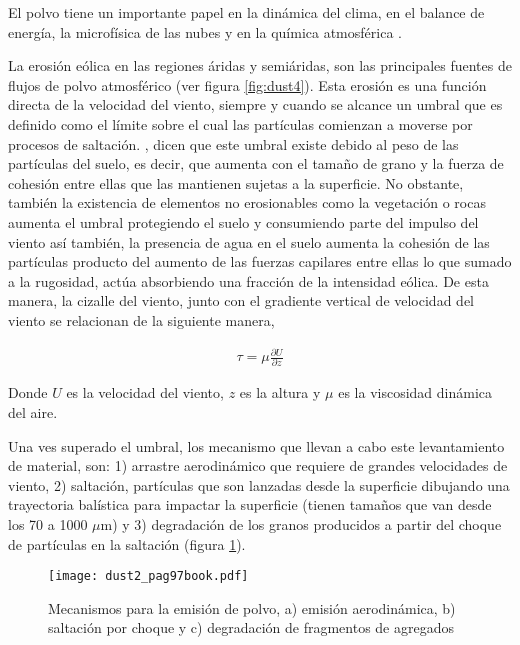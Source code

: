El polvo tiene un importante papel en la dinámica 
del clima, en el balance de energía, la microfísica de las nubes y en la química atmosférica \citep{tegen1994modeling,ridgwell2002dust,mahowald2011aerosol}. 

La erosión eólica en las regiones áridas y semiáridas, son las principales fuentes de flujos de polvo atmosférico (ver figura \ref{fig:dust4}). Esta erosión es una función directa de la velocidad del viento, siempre  y cuando se alcance un umbral que es definido como el límite sobre el cual las partículas comienzan a moverse por procesos de saltación. \cite{iversen1982saltation}, dicen que este umbral existe debido al peso de las partículas del suelo, es decir, que aumenta con el tamaño de grano y la fuerza de cohesión entre ellas que las mantienen sujetas a la superficie. No obstante, también la existencia de elementos no erosionables como la vegetación o rocas aumenta el umbral protegiendo el suelo y consumiendo parte del impulso del viento \citep{marticorena1997factors,tegen1994modeling} así también, la presencia de agua en el suelo aumenta la cohesión de las partículas producto del aumento de las fuerzas capilares entre ellas \citep{bopp2003dust} lo que sumado a la rugosidad, actúa absorbiendo una fracción de la intensidad eólica. De esta manera, la cizalle del viento, junto con el gradiente vertical de velocidad del viento se relacionan de la siguiente manera,

\begin{equation} \label{eq:marco1.5}
\begin{split}
\tau = \mu {\frac{\partial U}{\partial z}}
\end{split}
\end{equation}

Donde $U$ es la velocidad del viento, $z$ es la altura y $\mu$ es la viscosidad dinámica del aire. 

Una ves superado el umbral, los mecanismo que llevan a cabo este levantamiento de material, son: 1) arrastre aerodinámico que requiere de grandes velocidades de viento, 2) saltación, partículas que son lanzadas desde la superficie dibujando una trayectoria balística para impactar la superficie (tienen tamaños que van desde los 70 a 1000 $\mu$m) y 3) degradación de los granos producidos a partir del choque de partículas en la saltación (figura \ref{fig:dust2}). \newpage

\begin{figure}[H]
\centering
 \texttt{[image: dust2\_pag97book.pdf]}
 \caption[Mecanismos de emisión de polvo]{Mecanismos para la emisión de polvo, a) emisión aerodinámica, b) saltación por choque y c) degradación de fragmentos de agregados }
  \label{fig:dust2}
\end{figure}


